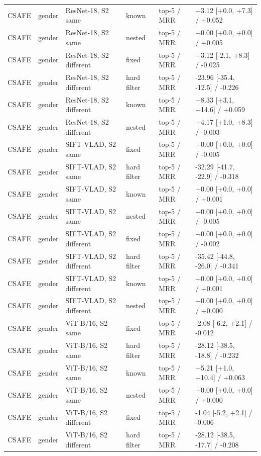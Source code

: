 \documentclass[10pt,a4paper]{article}
\begin{document}
{\begin{longtable}{llllll}
CSAFE & gender & ResNet-18, S2 same & known & top-5 / MRR & +3.12 [+0.0, +7.3] / +0.052 \\
CSAFE & gender & ResNet-18, S2 same & nested & top-5 / MRR & +0.00 [+0.0, +0.0] / +0.005 \\
CSAFE & gender & ResNet-18, S2 different & fixed & top-5 / MRR & +3.12 [-2.1, +8.3] / -0.025 \\
CSAFE & gender & ResNet-18, S2 different & hard filter & top-5 / MRR & -23.96 [-35.4, -12.5] / -0.226 \\
CSAFE & gender & ResNet-18, S2 different & known & top-5 / MRR & +8.33 [+3.1, +14.6] / +0.059 \\
CSAFE & gender & ResNet-18, S2 different & nested & top-5 / MRR & +4.17 [+1.0, +8.3] / -0.003 \\
CSAFE & gender & SIFT-VLAD, S2 same & fixed & top-5 / MRR & +0.00 [+0.0, +0.0] / -0.005 \\
CSAFE & gender & SIFT-VLAD, S2 same & hard filter & top-5 / MRR & -32.29 [-41.7, -22.9] / -0.318 \\
CSAFE & gender & SIFT-VLAD, S2 same & known & top-5 / MRR & +0.00 [+0.0, +0.0] / +0.001 \\
CSAFE & gender & SIFT-VLAD, S2 same & nested & top-5 / MRR & +0.00 [+0.0, +0.0] / -0.005 \\
CSAFE & gender & SIFT-VLAD, S2 different & fixed & top-5 / MRR & +0.00 [+0.0, +0.0] / -0.002 \\
CSAFE & gender & SIFT-VLAD, S2 different & hard filter & top-5 / MRR & -35.42 [-44.8, -26.0] / -0.341 \\
CSAFE & gender & SIFT-VLAD, S2 different & known & top-5 / MRR & +0.00 [+0.0, +0.0] / +0.001 \\
CSAFE & gender & SIFT-VLAD, S2 different & nested & top-5 / MRR & +0.00 [+0.0, +0.0] / +0.000 \\
CSAFE & gender & ViT-B/16, S2 same & fixed & top-5 / MRR & -2.08 [-6.2, +2.1] / -0.012 \\
CSAFE & gender & ViT-B/16, S2 same & hard filter & top-5 / MRR & -28.12 [-38.5, -18.8] / -0.232 \\
CSAFE & gender & ViT-B/16, S2 same & known & top-5 / MRR & +5.21 [+1.0, +10.4] / +0.063 \\
CSAFE & gender & ViT-B/16, S2 same & nested & top-5 / MRR & +0.00 [+0.0, +0.0] / +0.000 \\
CSAFE & gender & ViT-B/16, S2 different & fixed & top-5 / MRR & -1.04 [-5.2, +2.1] / -0.006 \\
CSAFE & gender & ViT-B/16, S2 different & hard filter & top-5 / MRR & -28.12 [-38.5, -17.7] / -0.208 \\

\end{longtable}}
\end{document}

